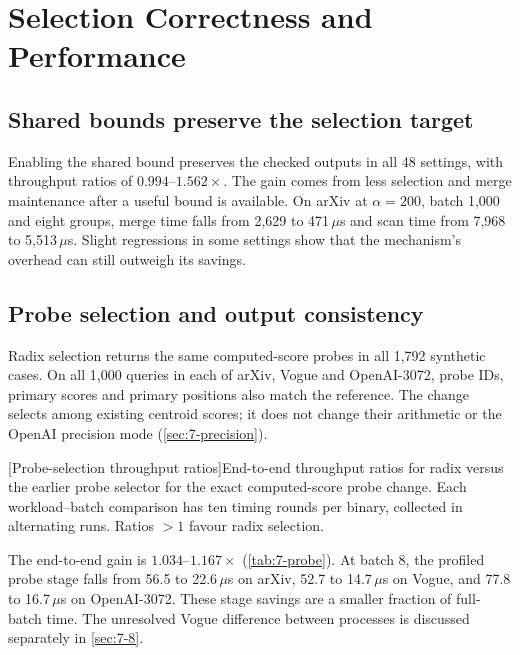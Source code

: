 \section{Selection Correctness and Performance}
\label{sec:7-4}




\subsection{Shared bounds preserve the selection target}

Enabling the shared bound preserves the checked outputs in all
48 settings, with throughput ratios of $0.994$--$1.562\times$.
The gain comes from less selection and merge maintenance after a useful
bound is available. On arXiv at $\alpha=200$, batch 1,000 and eight
groups, merge time falls from 2,629 to 471\,$\mu$s and scan time from
7,968 to 5,513\,$\mu$s. Slight regressions in some settings show that
the mechanism's overhead can still outweigh its savings.

\subsection{Probe selection and output consistency}

Radix selection returns the same computed-score probes in all 1,792
synthetic cases. On all 1,000 queries in each of arXiv, Vogue and OpenAI-3072,
probe IDs, primary scores and primary positions also match the reference.
The change selects among existing centroid scores; it does not change
their arithmetic or the OpenAI precision mode
(\cref{sec:7-precision}).

\par\medskip\noindent\begin{minipage}{\linewidth}
\captionsetup{hypcap=false}
\centering
{}[Probe-selection throughput ratios]{End-to-end throughput ratios for radix versus the earlier probe selector for the exact computed-score probe
 change. Each workload--batch comparison has ten timing rounds per binary,
 collected in alternating runs. Ratios $>1$ favour radix selection.}
\label{tab:7-probe}
\small

\end{minipage}\par\medskip

The end-to-end gain is $1.034$--$1.167\times$
(\cref{tab:7-probe}). At batch 8, the profiled probe stage falls from
56.5 to 22.6\,$\mu$s on arXiv, 52.7 to 14.7\,$\mu$s on Vogue, and
77.8 to 16.7\,$\mu$s on OpenAI-3072. These stage savings are a smaller
fraction of full-batch time. The unresolved Vogue difference between
processes is discussed separately in \cref{sec:7-8}.

